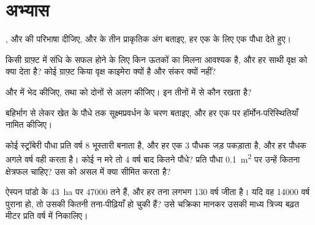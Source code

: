\section{अभ्यास}

\begin{exercise}[$\star$]\label{exo:b2:asexual-reproduction:1}
,  और  की परिभाषा दीजिए, और
 के तीन प्राकृतिक अंग बताइए, हर एक के लिए एक पौधा देते हुए।
\end{exercise}

\begin{exercise}[$\star$]\label{exo:b2:asexual-reproduction:2}
किसी ग्राफ़्ट में संधि के सफल होने के लिए किन ऊतकों का मिलना आवश्यक है,
और हर साथी वृक्ष को क्या देता है? कोई ग्राफ़्ट किया वृक्ष काइमेरा क्यों
है और संकर क्यों नहीं?
\end{exercise}

\begin{exercise}[$\star$]\label{exo:b2:asexual-reproduction:3}
 और  में भेद कीजिए, तथा
 को दोनों से अलग कीजिए। इन तीनों में से कौन  रखता है?
\end{exercise}

\begin{exercise}[$\star$]\label{exo:b2:asexual-reproduction:4}
बहिर्भाग से लेकर खेत के पौधे तक सूक्ष्मप्रवर्धन के चरण बताइए, और हर एक
पर हॉर्मोन-परिस्थितियाँ नामित कीजिए।
\end{exercise}

\begin{exercise}[$\star\star$]\label{exo:b2:asexual-reproduction:5}
कोई स्ट्रॉबेरी पौधा प्रति वर्ष 8 भूस्तारी बनाता है, और हर एक 3
पौधक जड़ पकड़ाता है, और हर पौधक अगले वर्ष वही करता है।
कोई न मरे तो 4 वर्ष बाद कितने पौधे? प्रति पौधा \qty{0.1}{m^2} पर
उन्हें कितना क्षेत्रफल चाहिए? उस  को असल में क्या सीमित करता है?
\end{exercise}

\begin{exercise}[$\star\star$]\label{exo:b2:asexual-reproduction:6}
ऐस्पन  पांडो के \qty{43}{ha} पर \num{47000} तने हैं, और हर
तना लगभग \num{130} वर्ष जीता है। यदि वह  \num{14000} वर्ष
पुराना हो, तो उसकी कितनी तना-पीढ़ियाँ हो चुकी हैं? उसे चक्रिका मानकर
उसकी माध्य त्रिज्य बढ़त मीटर प्रति वर्ष में निकालिए।
\end{exercise}


